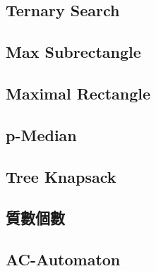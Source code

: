 \documentclass[a4paper,10pt,twocolumn,oneside]{article}
\begin{document}
\subsection{Ternary Search}


\subsection{Max Subrectangle}


\subsection{Maximal Rectangle}


\subsection{p-Median}


\subsection{Tree Knapsack}


\subsection{質數個數}


\subsection{AC-Automaton}
 

% 

%

% 

\end{document}
